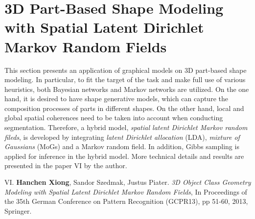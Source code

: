 \section{3D Part-Based Shape Modeling with Spatial Latent Dirichlet Markov Random Fields}
\label{sec:3D_Shape}
This section presents an application of graphical models on 3D part-based shape modeling. In particular, to fit the target of the task and make full use of various heuristics, 
both Bayesian networks and Markov networks are utilized. On the one hand, it is desired to have shape generative models, which can capture the composition processes of parts        
in different shapes. On the other hand, local and global spatial coherences need to be taken into account when conducting segmentation.  
Therefore, a hybrid model, \emph{spatial latent Dirichlet Markov random fileds}, is developed by integrating \emph{latent Dirichlet allocation} (LDA), \emph{mixture of Gaussians} (MoGs) and  
a Markov random field. In addition, Gibbs sampling is applied for inference in the hybrid model.      
More technical details and results are presented in the paper VI by the author. 

\begin{shaded}
{\Huge VI.} \textbf{Hanchen Xiong}, Sandor Szedmak, Justus Piater. {\it 3D Object Class Geometry Modeling with Spatial Latent Dirichlet Markov Random Fields}, In Proceedings of the 35th German Conference on Pattern Recognition (GCPR13), pp 51-60, 2013,  Springer.  
\vspace{-.2cm}

\end{shaded}

